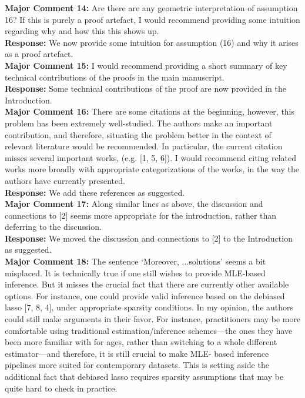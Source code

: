 \documentclass[12pt]{article}
\begin{document}
{\bf Major Comment 14:} Are there are any geometric interpretation of assumption 16? If this is purely a proof artefact, I would recommend providing some intuition regarding why and how this this shows up. \\

{\bf Response:} We now provide some intuition for assumption (16) and why it arises as a proof artefact.  \\



{\bf Major Comment 15:} I would recommend providing a short summary of key technical contributions of the proofs in the main manuscript.
 \\

{\bf Response:} Some technical contributions of the proof are now provided in the Introduction. \\



{\bf Major Comment 16:} There are some citations at the beginning, however, this problem has been extremely well-studied. The authors make an important contribution, and therefore, situating the problem better in the context of relevant literature would be recommended. In particular, the current citation misses several important works, (e.g. [1, 5, 6]). I would recommend citing related works more broadly with appropriate categorizations of the works, in the way the authors have currently presented. \\

{\bf Response:} We add these references as suggested. \\



{\bf Major Comment 17:} Along similar lines as above, the discussion and connections to [2] seems more appropriate for the introduction, rather than deferring to the discussion. \\

{\bf Response:} We moved the discussion and connections to [2] to the Introduction as suggested. \\



{\bf Major Comment 18:} The sentence ‘Moreover, ...solutions’ seems a bit misplaced. It is technically true if one still wishes to provide MLE-based inference. But it misses the crucial fact that there are currently other available options. For instance, one could provide valid inference based on the debiased lasso [7, 8, 4], under appropriate sparsity conditions. In my opinion, the authors could still make arguments in their favor. For instance, practitioners may be more comfortable using traditional estimation/inference schemes—the ones they have been more familiar with for ages, rather than switching to a whole different estimator—and therefore, it is still crucial to make MLE- based inference pipelines more suited for contemporary datasets. This is setting aside the additional fact that debiased lasso requires sparsity assumptions that may be quite hard to check in practice. \\
\end{document}
